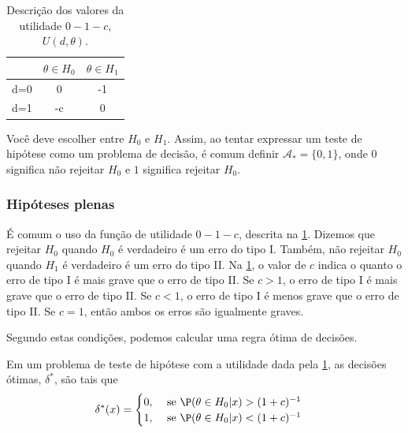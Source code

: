 \begin{table}
 \centering
 \begin{tabular}{|c|c|c|}
  \hline
  & $\theta \in H_{0}$	& $\theta \in H_{1}$ \\
  \hline 
  d=0 & 0 & -1 \\
  d=1 & -c & 0 \\
  \hline
 \end{tabular}
 \caption{Descrição dos valores da utilidade 
 $0-1-c$, $U(d,\theta)$.}
 \label{table:u-0-1-c}
\end{table}

Você deve escolher entre $H_{0}$ e $H_{1}$.
Assim, ao tentar expressar um teste de hipótese como
um problema de decisão,
é comum definir $\mathcal{A}_{*} = \{0,1\}$,
onde $0$ significa não rejeitar $H_{0}$ e 
$1$ significa rejeitar $H_{0}$.

\subsubsection{Hipóteses plenas}

É comum o uso da função de utilidade $0-1-c$,
descrita na \cref{table:u-0-1-c}.
Dizemos que rejeitar $H_{0}$ quando 
$H_{0}$ é verdadeiro é um erro do tipo I.
Também, não rejeitar $H_{0}$ quando 
$H_{1}$ é verdadeiro é um erro do tipo II.
Na \cref{table:u-0-1-c},
o valor de $c$ indica o quanto o erro de tipo I
é mais grave que o erro de tipo II.
Se $c > 1$, o erro de tipo I é mais grave que
o erro de tipo II.
Se $c < 1$, o erro de tipo I é menos grave que
o erro de tipo II.
Se $c = 1$, então ambos os erros são igualmente graves.

Segundo estas condições,
podemos calcular uma regra ótima de decisões.

\begin{theorem}
 \label{thm:0-1-c}
 Em um problema de teste de hipótese com a utilidade
 dada pela \cref{table:u-0-1-c},
 as decisões ótimas, $\delta^{*}$, são tais que
 \begin{align*}
  \delta^{*}(x)	&=
  \begin{cases}
   0, & \text{ se } 
   \P(\theta \in H_{0}|x) > (1+c)^{-1} \\
   1, & \text{ se } 
   \P(\theta \in H_{0}|x) < (1+c)^{-1}
  \end{cases}
 \end{align*}
\end{theorem}

